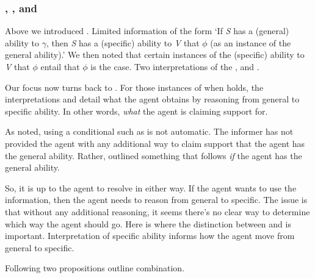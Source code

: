 \subsubsection{\AR{}, \WR{}, and \gsi{}}
\label{sec:ar-wr-gsi}

\begin{note}[Summarising]
  Above we introduced \gsi{}.
  Limited information of the form `If \emph{S} has a (general) ability to \(\gamma\), then \emph{S} has a (specific) ability to \emph{V} that \(\phi\) (as an instance of the general ability).'
  We then noted that certain instances of the (specific) ability to \emph{V} that \(\phi\) entail that \(\phi\) is the case.
  Two interpretations of the \aben{}, \AR{} and \WR{}.

  Our focus now turns back to \gsi{}.
  For those instances of \gsi{} when \aben{} holds, the interpretations \AR{} and \WR{} detail what the agent obtains by reasoning from general to specific ability.
  In other words, \emph{what} the agent is claiming support for.

  As noted, using a conditional such as \gsi{} is not automatic.
  The informer has not provided the agent with any additional way to claim support that the agent has the general ability.
  Rather, outlined something that follows \emph{if} the agent has the general ability.

  So, it is up to the agent to resolve in either way.
  If the agent wants to use the information, then the agent needs to reason from general to specific.
  The issue is that without any additional reasoning, it seems there's no clear way to determine which way the agent should go.
  Here is where the distinction between \AR{} and \WR{} is important.
  Interpretation of specific ability informs how the agent move from general to specific.

  Following two propositions outline combination.
\end{note}

